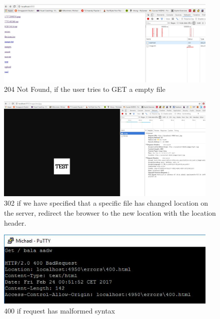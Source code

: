 \documentclass[a4paper,12pt]{article}
\numberwithin{figure}{section}
\begin{document}
\begin{figure}[h!]
	\centering
	\label{204}
	\includegraphics[width=0.95\textwidth,keepaspectratio]{img/204.jpg} 
	\caption{204 Not Found, if the user tries to GET a empty file}
\end{figure}

\begin{figure}[h!]
	\centering
	\label{302}
	\includegraphics[width=0.95\textwidth,keepaspectratio]{img/302.jpg} 
	\caption{302 if we have specified that a specific file has changed location on the server, redirect the browser to the new location with the location header.}
\end{figure}

\begin{figure}[h!]
	\centering
	\label{400}
	\includegraphics[width=0.95\textwidth,keepaspectratio]{img/400.jpg} 
	\caption{400 if request has malformed syntax}
\end{figure}
\end{document}

